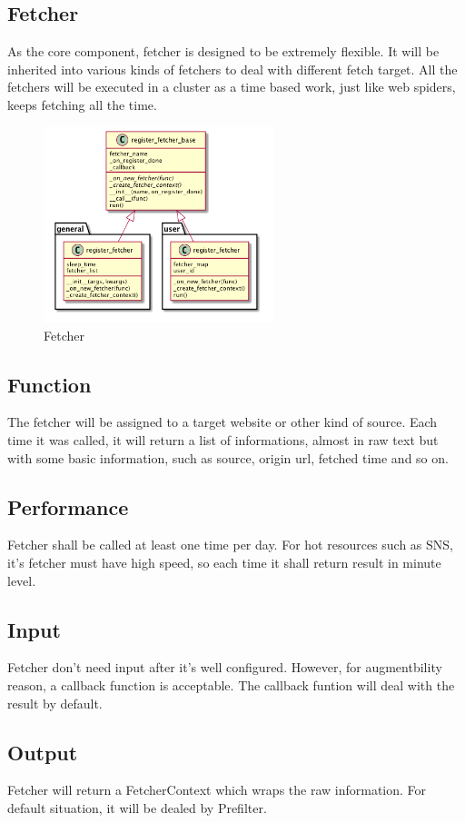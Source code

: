 
\subsection{Fetcher}
  As the core component, fetcher is designed to be extremely flexible.
  It will be inherited into various kinds of fetchers to deal with different fetch target.
  All the fetchers will be executed in a cluster as a time based work, just like web spiders, keeps fetching all the time.
  \begin{figure}[H]
    \centering
    \includegraphics[width=0.6\textwidth]{img/fetcher.png}
    \caption{Fetcher\label{fig:fetcher}}
  \end{figure}

  \subsection{Function}
    The fetcher will be assigned to a target website or other kind of source.
    Each time it was called, it will return a list of informations, almost in raw text but with some basic information,
    such as source, origin url, fetched time and so on.

  \subsection{Performance}
    Fetcher shall be called at least one time per day. For hot resources such as SNS, it's fetcher must have high speed,
    so each time it shall return result in minute level.

  \subsection{Input}
    Fetcher don't need input after it's well configured. However, for augmentbility reason, a callback function is acceptable.
    The callback funtion will deal with the result by default.

  \subsection{Output}
    Fetcher will return a FetcherContext which wraps the raw information. For default situation, it will be dealed by Prefilter.

